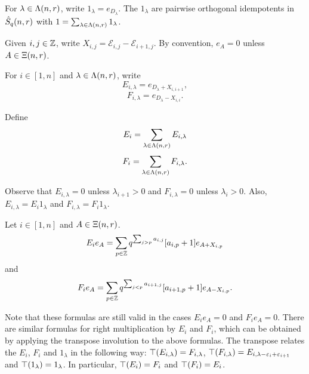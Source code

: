 \documentclass[a4paper, 11pt]{report}
\begin{document}
For $\lambda\in\Lambda(n,r)$, write $1_\lambda = e_{D_\lambda}$. The $1_\lambda$ are pairwise orthogonal idempotents in $\hat{S}_q(n,r)$ with $1 = \sum_{\lambda\in\Lambda(n,r)}1_\lambda$.

Given $i,j\in\mathbb{Z}$, write $X_{i,j} = \mathcal{E}_{i,j} - \mathcal{E}_{i+1,j}$. By convention, $e_A = 0$ unless $A\in\Xi(n,r)$.

For $i\in [1,n]$ and $\lambda\in\Lambda(n,r)$, write
\begin{equation*}
E_{i,\lambda} = e_{D_\lambda + X_{i,i+1}},
\end{equation*}
\begin{equation*}
F_{i,\lambda} = e_{D_\lambda - X_{i,i}}.
\end{equation*}

Define
\begin{equation*}
E_i = \sum_{\lambda\in\Lambda(n,r)} E_{i,\lambda}
\end{equation*}
\begin{equation*}
F_i = \sum_{\lambda\in\Lambda(n,r)} F_{i,\lambda}.
\end{equation*}

Observe that $E_{i,\lambda}=0$ unless $\lambda_{i+1} > 0$ and $F_{i,\lambda}=0$ unless $\lambda_i > 0$. Also, $E_{i,\lambda} = E_i 1_\lambda$ and $F_{i,\lambda} = F_i 1_\lambda$. 
\begin{lemma}
Let $i\in [1,n]$ and $A\in\Xi(n,r)$.
\begin{equation*}
E_ie_A = \sum_{p\in\mathbb{Z}} q^{\sum_{j>p} a_{i,j}}[a_{i,p}+1] e_{A + X_{i,p}}
\end{equation*}
and
\begin{equation*}                                                                               
F_ie_A = \sum_{p\in\mathbb{Z}} q^{\sum_{j<p} a_{i+1,j}}[a_{i+1,p}+1] e_{A - X_{i,p}}.
\end{equation*}
\end{lemma}

Note that these formulas are still valid in the cases $E_ie_A=0$ and $F_ie_A=0$. There are similar formulas for right multiplication by $E_i$ and $F_i$, which can be obtained by applying the transpose involution to the above formulas. The transpose relates the $E_i$, $F_i$ and $1_\lambda$ in the following way: $\top(E_{i,\lambda}) = F_{i,\lambda}$, $\top(F_{i,\lambda}) = E_{i,\lambda -\varepsilon_i +\varepsilon_{i+1}}$ and $\top(1_\lambda) = 1_\lambda$. In particular, $\top(E_i) = F_i$ and $\top(F_i) = E_i$.
\end{document}
